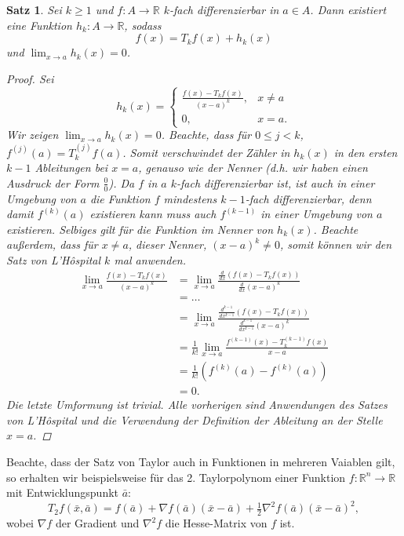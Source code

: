 \documentclass[12pt]{article}
\newtheorem{theorem}{Satz}
\begin{document}
\begin{theorem}
	Sei $k \geq 1$ und $f\colon A \to \mathbb{R}$ $k$-fach differenzierbar in $a \in A$. Dann existiert eine Funktion $h_k \colon A \to \mathbb{R}$, sodass
	$$
		f(x) = T_kf(x) + h_k(x)
	$$
	und $\lim_{x \to a} h_k(x) = 0$.
	\begin{proof}
		Sei
		$$
			h_k(x) = \begin{cases}
				\tfrac{f(x) - T_kf(x)}{(x-a)^k}, & x \neq a\\
				0, & x = a.
			\end{cases}
		$$
		Wir zeigen $\lim_{x \to a} h_k(x) = 0$. Beachte, dass für $0 \leq j < k$, $f^{(j)}(a) = T_k^{(j)}f(a)$. Somit verschwindet der Zähler in $h_k(x)$ in den ersten $k-1$ Ableitungen bei $x = a$, genauso wie der Nenner (d.h. wir haben einen Ausdruck der Form $\tfrac{0}{0}$). Da $f$ in $a$ $k$-fach differenzierbar ist, ist auch in einer Umgebung von $a$ die Funktion $f$ mindestens $k-1$-fach differenzierbar, denn damit $f^{(k)}(a)$ existieren kann muss auch $f^{(k-1)}$ in einer Umgebung von $a$ existieren. Selbiges gilt für die Funktion im Nenner von $h_k(x)$. Beachte außerdem, dass für $x \neq a$, dieser Nenner, $(x-a)^k \neq 0$, somit können wir den Satz von L'H\^ospital $k$ mal anwenden.
		\begin{align*}
			\lim_{x \to a} \frac{f(x) - T_kf(x)}{(x-a)^k} &= \lim_{x \to a} \frac{\frac{d}{dx}(f(x) - T_kf(x))}{\frac{d}{dx}(x-a)^k}\\
			&= \ldots\\
			&= \lim_{x \to a} \frac{\frac{d^{k-1}}{dx^{k-1}}(f(x) - T_kf(x))}{\frac{d^{k-1}}{dx^{k-1}}(x-a)^k}\\
			&= \frac{1}{k!} \lim_{x \to a} \frac{f^{(k-1)}(x) - T_k^{(k-1)}f(x)}{x-a}\\
			&= \frac{1}{k!}(f^{(k)}(a) - f^{(k)}(a))\\
			&= 0.
		\end{align*}
		Die letzte Umformung ist trivial. Alle vorherigen sind Anwendungen des Satzes von L'H\^ospital und die Verwendung der Definition der Ableitung an der Stelle $x = a$.
	\end{proof}
\end{theorem}
Beachte, dass der Satz von Taylor auch in Funktionen in mehreren Vaiablen gilt, so erhalten wir beispielsweise für das 2. Taylorpolynom einer Funktion $f\colon \mathbb{R}^n \to \mathbb{R}$ mit Entwicklungspunkt $\bar{a}$:
$$
	T_2f(\bar{x}, \bar{a}) = f(\bar{a}) + \nabla f(\bar{a}) (\bar{x} - \bar{a}) + \tfrac{1}{2} \nabla^2 f(\bar{a}) (\bar{x} - \bar{a})^2,
$$
wobei $\nabla f$ der Gradient und $\nabla^2 f$ die Hesse-Matrix von $f$ ist.
\end{document}
